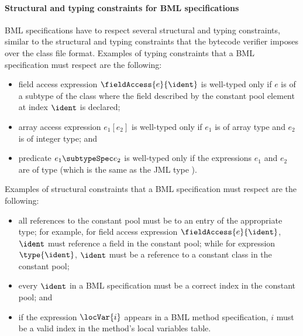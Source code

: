 \paragraph{Structural and typing constraints for BML specifications}
BML specifications have to respect several structural and typing
constraints, similar to the structural and typing constraints that the
bytecode verifier imposes over the class file format.  Examples of
typing constraints that a BML specification must respect are the
following:
\begin{itemize}
\item field access expression
    $\fieldAccess{e}{\ident}$ is well-typed only if $e$ is
    of a subtype of the class where the field described by the constant
    pool element at index $\ident$ is declared; 

\item array access expression
$e_1[e_2]$ is well-typed only if $e_1$ is of array
type and $e_2$ is of integer type; and


    

\item predicate $e_1 \subtypeSpec e_2$ is well-typed only if the 
expressions $e_1$ and $e_ 2$ are of type 
(which is the same as the JML type \TYPE).


	  
\end{itemize}

Examples of structural constraints that a BML specification must
respect are the following: 
\begin{itemize}
\item all references to the constant pool must be to an entry of the
appropriate type; for example, for field access expression
$\fieldAccess{e}{\ident}$, $\ident$ must reference a
field in the constant pool; while for expression $\type{\ident}$,
\(\ident\) must be a reference to a constant class in the
constant pool;
    
\item every $\ident$ in a BML specification must be a correct
index in the constant pool; and
    
\item if the expression $\locVar{i}$ appears in a BML method 
specification, $i$ must be a valid index in the method's local
variables table.
\end{itemize}

